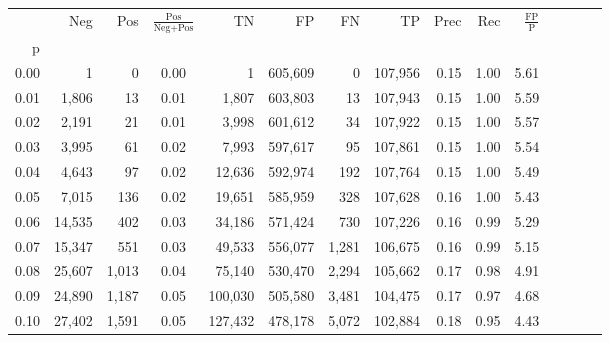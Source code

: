 \begin{tabular}{rrrcrrrrrrrrrrr}
\toprule
{} &     Neg &    Pos & $\frac{\text{Pos}}{\text{Neg}+\text{Pos}}$ &       TN &       FP &       FN &       TP &  Prec &   Rec & $\frac{\text{FP}}{\text{P}}$ \\
p    &         &        &                                            &          &          &          &          &       &       &                              \\
\midrule
0.00 &       1 &      0 &                                       0.00 &        1 &  605,609 &        0 &  107,956 &  0.15 &  1.00 &                         5.61 \\
0.01 &   1,806 &     13 &                                       0.01 &    1,807 &  603,803 &       13 &  107,943 &  0.15 &  1.00 &                         5.59 \\
0.02 &   2,191 &     21 &                                       0.01 &    3,998 &  601,612 &       34 &  107,922 &  0.15 &  1.00 &                         5.57 \\
0.03 &   3,995 &     61 &                                       0.02 &    7,993 &  597,617 &       95 &  107,861 &  0.15 &  1.00 &                         5.54 \\
0.04 &   4,643 &     97 &                                       0.02 &   12,636 &  592,974 &      192 &  107,764 &  0.15 &  1.00 &                         5.49 \\
0.05 &   7,015 &    136 &                                       0.02 &   19,651 &  585,959 &      328 &  107,628 &  0.16 &  1.00 &                         5.43 \\
0.06 &  14,535 &    402 &                                       0.03 &   34,186 &  571,424 &      730 &  107,226 &  0.16 &  0.99 &                         5.29 \\
0.07 &  15,347 &    551 &                                       0.03 &   49,533 &  556,077 &    1,281 &  106,675 &  0.16 &  0.99 &                         5.15 \\
0.08 &  25,607 &  1,013 &                                       0.04 &   75,140 &  530,470 &    2,294 &  105,662 &  0.17 &  0.98 &                         4.91 \\
0.09 &  24,890 &  1,187 &                                       0.05 &  100,030 &  505,580 &    3,481 &  104,475 &  0.17 &  0.97 &                         4.68 \\
0.10 &  27,402 &  1,591 &                                       0.05 &  127,432 &  478,178 &    5,072 &  102,884 &  0.18 &  0.95 &                         4.43 \\

\end{tabular}
